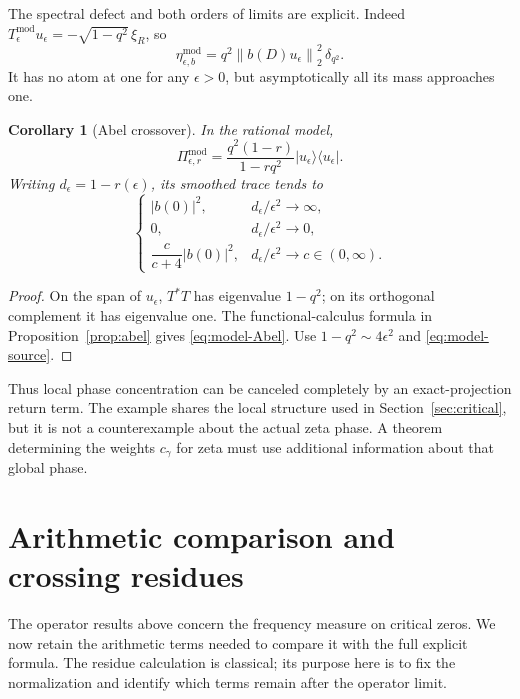 \documentclass[11pt]{article}
\numberwithin{equation}{section}
\newtheorem{corollary}[theorem]{Corollary}
\theoremstyle{definition}
\theoremstyle{remark}
\newcommand{\norm}[1]{\left\lVert #1\right\rVert}
\begin{document}
The spectral defect and both orders of limits are explicit.
Indeed \(T_\epsilon^{\mathrm{mod}}u_\epsilon
=-\sqrt{1-q^2}\,\xi_R\), so
\begin{equation}\label{eq:model-eta}
\eta_{\epsilon,b}^{\mathrm{mod}}
=q^2\norm{b(D)u_\epsilon}_2^2\,\delta_{q^2}.
\end{equation}
It has no atom at one for any \(\epsilon>0\), but asymptotically
all its mass approaches one.

\begin{corollary}[Abel crossover]\label{cor:crossover}
In the rational model,
\begin{equation}\label{eq:model-Abel}
\Pi_{\epsilon,r}^{\mathrm{mod}}
=\frac{q^2(1-r)}{1-rq^2}
|u_\epsilon\rangle\langle u_\epsilon|.
\end{equation}
Writing \(d_\epsilon=1-r(\epsilon)\), its smoothed trace tends to
\[
\begin{cases}
|b(0)|^2,& d_\epsilon/\epsilon^2\to\infty,\\
0,& d_\epsilon/\epsilon^2\to0,\\
\dfrac{c}{c+4}|b(0)|^2,& d_\epsilon/\epsilon^2\to c\in(0,\infty).
\end{cases}
\]
\end{corollary}
\begin{proof}
On the span of \(u_\epsilon\), \(T^*T\) has eigenvalue
\(1-q^2\); on its orthogonal complement it has eigenvalue one.
The functional-calculus formula in Proposition~\ref{prop:abel}
gives \eqref{eq:model-Abel}.
Use \(1-q^2\sim4\epsilon^2\) and \eqref{eq:model-source}.
\end{proof}

Thus local phase concentration can be canceled completely by an
exact-projection return term. The example shares the local structure
used in Section~\ref{sec:critical}, but it is not a counterexample
about the actual zeta phase. A theorem determining the weights
\(c_\gamma\) for zeta must use additional information about that
global phase.

\section{Arithmetic comparison and crossing residues}\label{sec:arithmetic}

The operator results above concern the frequency measure on critical
zeros. We now retain the arithmetic terms needed to compare it with
the full explicit formula. The residue calculation is classical;
its purpose here is to fix the normalization and identify which
terms remain after the operator limit.
\end{document}
